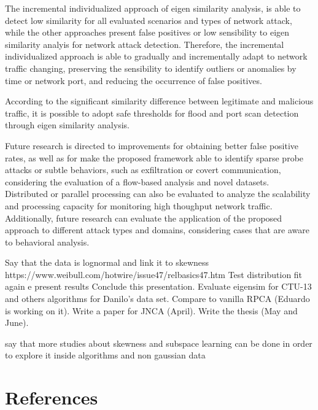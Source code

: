 \documentclass[review]{elsarticle}
\begin{document}
The incremental individualized approach of eigen similarity analysis, is able to detect low similarity for all evaluated scenarios and types of network attack, while the other approaches present false positives or low sensibility to eigen similarity analyis for network attack detection. Therefore, the incremental individualized approach is able to gradually and incrementally adapt to network traffic changing, preserving the sensibility to identify outliers or anomalies by time or network port, and reducing the occurrence of false positives.

According to the significant similarity difference between legitimate and malicious traffic, it is possible to adopt safe thresholds for flood and port scan detection through eigen similarity analysis.

Future research is directed to improvements for obtaining better false positive rates, as well as for make the proposed framework able to identify sparse probe attacks or subtle behaviors, such as exfiltration or covert communication, considering the evaluation of a flow-based analysis and novel datasets. Distributed or parallel processing can also be evaluated to analyze the scalability and processing capacity for monitoring high thoughput network traffic. Additionally, future research can evaluate the application of the proposed approach to different attack types and domains, considering cases that are aware to behavioral analysis.


Say that the data is lognormal \cite{benson2010network} and link it to skewness https://www.weibull.com/hotwire/issue47/relbasics47.htm
Test distribution fit again e present results
Conclude this presentation.
Evaluate eigensim for CTU-13 and others algorithms for Danilo's data set.
Compare to vanilla RPCA (Eduardo is working on it).
Write a paper for JNCA (April).
Write the thesis (May and June).

say that more studies about skewness and subspace learning can be done in order to explore it inside algorithms and non gaussian data

\section*{References}


\end{document}
